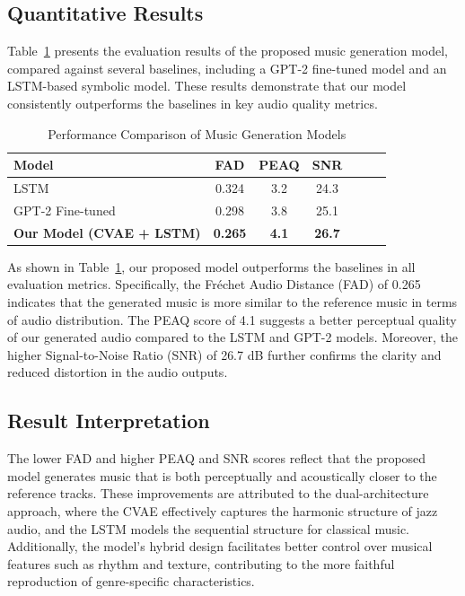 \documentclass[conference]{IEEEtran}
\begin{document}
\subsection{Quantitative Results}
Table~\ref{tab:evaluation-metrics} presents the evaluation results of the proposed music generation model, compared against several baselines, including a GPT-2 fine-tuned model and an LSTM-based symbolic model. These results demonstrate that our model consistently outperforms the baselines in key audio quality metrics.

\begin{table}[H]
    \centering
    \caption{Performance Comparison of Music Generation Models}
    \label{tab:evaluation-metrics}
    \begin{tabular}{lcccccc}
        \toprule
        \textbf{Model} & \textbf{FAD} & \textbf{PEAQ} & \textbf{SNR} \\
        \midrule
        LSTM & 0.324 & 3.2 & 24.3 \\
        GPT-2 Fine-tuned & 0.298 & 3.8 & 25.1 \\
        \textbf{Our Model (CVAE + LSTM)} & \textbf{0.265} & \textbf{4.1} & \textbf{26.7} \\
        \bottomrule
    \end{tabular}
\end{table}

As shown in Table~\ref{tab:evaluation-metrics}, our proposed model outperforms the baselines in all evaluation metrics. Specifically, the Fréchet Audio Distance (FAD) of 0.265 indicates that the generated music is more similar to the reference music in terms of audio distribution. The PEAQ score of 4.1 suggests a better perceptual quality of our generated audio compared to the LSTM and GPT-2 models. Moreover, the higher Signal-to-Noise Ratio (SNR) of 26.7 dB further confirms the clarity and reduced distortion in the audio outputs.

\subsection{Result Interpretation}
The lower FAD and higher PEAQ and SNR scores reflect that the proposed model generates music that is both perceptually and acoustically closer to the reference tracks. These improvements are attributed to the dual-architecture approach, where the CVAE effectively captures the harmonic structure of jazz audio, and the LSTM models the sequential structure for classical music. Additionally, the model's hybrid design facilitates better control over musical features such as rhythm and texture, contributing to the more faithful reproduction of genre-specific characteristics.
\end{document}
